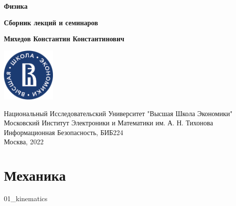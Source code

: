 \documentclass[a4paper,12pt]{article}
\begin{document}
  \begin{titlepage}
    \begin{center}
      \vspace*{1.5cm}

      \Huge
      \textbf{Физика}

      \vspace{0.5cm} \large
      \textbf{Сборник лекций и семинаров}

      \vspace{1.5cm} \normalsize
      \textbf{Михедов Константин Константинович}

      \vfill

      \includegraphics[width=0.2\textwidth]{hse_logo}

      \vspace{1cm} \footnotesize
      Национальный Исследовательский Университет "Высшая Школа Экономики" \\
      Московский Институт Электроники и Математики им. А. Н. Тихонова \\
      Информационная Безопасность, БИБ224 \\
      Москва, 2022
    \end{center}
  \end{titlepage}

  \section{Механика}
  {01_kinematics}
\end{document}
